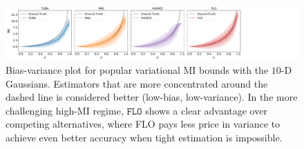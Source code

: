\documentclass{article}
\theoremstyle{plain}
\theoremstyle{definition}
\theoremstyle{remark}
\newcommand{\TUBA}{\texttt{TUBA}}
\newcommand{\FLO}{\texttt{FLO}}
\begin{document}
		
		
		
		
		\begin{figure}[t!]
			\begin{center}
				\includegraphics[width=1.2\textwidth]{figures/gauss/toymodel}
			\end{center}
			\vspace{-1.3em}
			\caption{Bias-variance plot for popular variational MI bounds with the $10$-D Gaussians. Estimators that are more concentrated around the dashed line is considered better (low-bias, low-variance). In the more challenging high-MI regime, $\FLO$ shows a clear advantage over competing alternatives, where FLO pays less price in variance to achieve even better accuracy when tight estimation is impossible.
				\label{fig:cmp_var_10d}}
		\end{figure}
		
\end{document}
